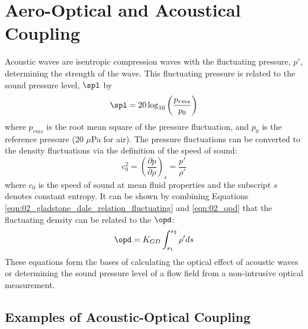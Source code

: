 
\chapter{Aero-Optical and Acoustical Coupling}

Acoustic waves are isentropic compression waves with the fluctuating pressure, $p'$, determining the strength of the wave.
This fluctuating pressure is related to the sound pressure level, $\spl$ by
\begin{equation}
  \spl = 20\log_{10}\left(\frac{p_{rms}}{p_0}\right)
  \label{eqn:03_spl}
\end{equation}
where $p_{rms}$ is the root mean square of the pressure fluctuation, and $p_0$ is the reference pressure (20 $\mu$Pa for air).
The pressure fluctuations can be converted to the density fluctuations via the definition of the speed of sound:
\begin{equation}
  c_0^2 = \left(\frac{\partial p}{\partial \rho}\right)_s=\frac{p'}{\rho'}
  \label{eqn:03_speed_sound}
\end{equation}
where $c_0$ is the speed of sound at mean fluid properties and the subscript $s$ denotes constant entropy.
It can be shown by combining Equations \ref{eqn:02_gladstone_dale_relation_fluctuating} and \ref{eqn:02_opd} that the fluctuating density can be related to the $\opd$:
\begin{equation}
  \opd = K_{GD}\int_{s_1}^{s_2}{\rho'}ds
  \label{eqn:03_opd_fluct}
\end{equation}
These equations form the bases of calculating the optical effect of acoustic waves or determining the sound pressure level of a flow field from a non-intrusive optical measurement.

\section{Examples of Acoustic-Optical Coupling}

